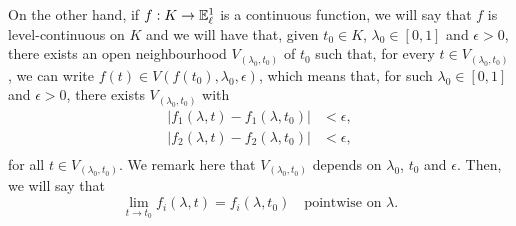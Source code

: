 \documentclass{amsart}
\newcommand{\fn}{\mathbb{E}\sp{1}}
\begin{document}
On the other hand, if $f:K\rightarrow \fn_{\ell}$ is a continuous function, we will say that $f$ is level-continuous on $K$ and we will have that, given $t_0\in K$,
$\lambda_0\in[0,1]$  and $\epsilon>0$, there exists an open neighbourhood $V_{(\lambda_0,t_0)}$ of $t_0$ such that, for every $t\in V_{(\lambda_0,t_0)}$, we can write
$f(t)\in V(f(t_0),\lambda_0,\epsilon)$,
which means that, for such $\lambda_0\in[0,1]$ and $\epsilon>0$, there exists $V_{(\lambda_0,t_0)}$ with
\[
\begin{aligned}
|f_1(\lambda,t)-f_1(\lambda,t_0)|&<\epsilon, \\
|f_2(\lambda,t)-f_2(\lambda,t_0)|&<\epsilon, \\
\end{aligned}
\]
for all $t\in V_{(\lambda_0,t_0)}$.
We remark here that $V_{(\lambda_0,t_0)}$ depends  on $\lambda_0$, $t_0$ and $\epsilon$.
Then, we will say that
\begin{equation}\label{eq:pointconverg}
\lim_{t\to t_0} f_i(\lambda,t)=f_i(\lambda,t_0)\quad\text{pointwise on $\lambda$}.
\end{equation}
\end{document}
